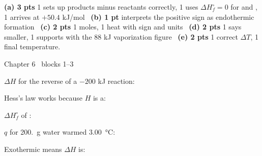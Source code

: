 \documentclass{apchem-worksheet}
\begin{document}
\begin{apcnote}
\textbf{(a) 3 pts} 1 sets up products minus reactants correctly, 1 uses
$\Delta H^\circ_f = 0$ for  and , 1 arrives at
$+50.4$ kJ/mol \textbullet\ \textbf{(b) 1 pt} interprets the positive sign
as endothermic formation \textbullet\ \textbf{(c) 2 pts} 1 moles, 1 heat
with sign and units \textbullet\ \textbf{(d) 2 pts} 1 says smaller,
1 supports with the 88 kJ vaporization figure \textbullet\
\textbf{(e) 2 pts} 1 correct $\Delta T$, 1 final temperature.
\end{apcnote}

\begin{spiralstrip}{Chapter 6 \textbullet\ blocks 1--3}
  \item $\Delta H$ for the reverse of a $-200$ kJ reaction:
  \item Hess's law works because $H$ is a:
  \item $\Delta H^\circ_f$ of : 
  \item $q$ for \SI{200.}{\gram} water warmed \SI{3.00}{\celsius}:
        \answerblank[3cm]{\SI{2510}{\joule}}
  \item Exothermic means $\Delta H$ is: 
\end{spiralstrip}
\end{document}
